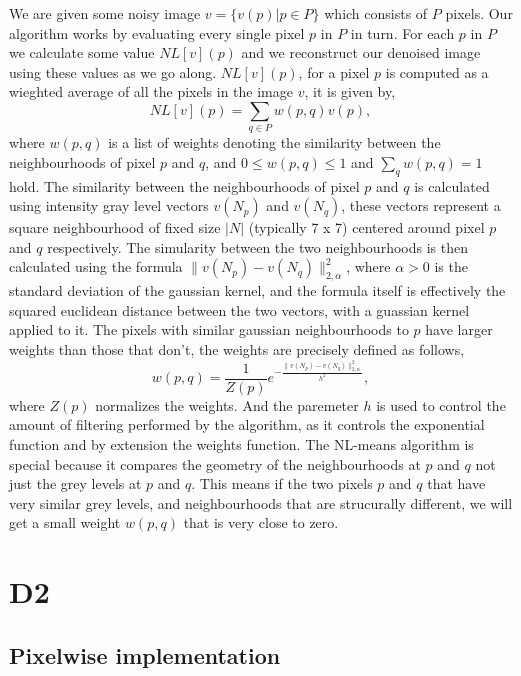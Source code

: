\documentclass[fullpage]{article}
\begin{document}
We are given some noisy image $v = \{v(p) | p \in P\}$ which consists of $P$ pixels. Our algorithm works by evaluating every single pixel $p$ in $P$ in turn. For each $p$ in $P$ we calculate some value $NL[v](p)$ and we reconstruct our denoised image using these values as we go along. $NL[v](p)$, for a pixel $p$ is computed as a wieghted average of all the pixels in the image $v$, it is given by,
$$NL[v](p) = \sum_{q \in P} w(p,q)v(p),$$
where $w(p,q)$ is a list of weights denoting the similarity between the neighbourhoods of pixel $p$ and $q$, and $0 \le w(p,q) \le 1$ and $\sum_{q}w(p,q) = 1$ hold. The similarity between the neighbourhoods of pixel $p$ and $q$ is calculated using intensity gray level vectors $v(N_{p})$ and $v(N_{q})$, these vectors represent a square neighbourhood of fixed size $|N|$ (typically 7 x 7) centered around pixel $p$ and $q$ respectively. The simularity between the two neighbourhoods is then calculated using the formula $\parallel v(N_{p}) - v(N_{q}) \parallel_{2, \alpha}^{2}$, where $\alpha > 0$ is the standard deviation of the gaussian kernel, and the formula itself is effectively the squared euclidean distance between the two vectors, with a guassian kernel applied to it. The pixels with similar gaussian neighbourhoods to $p$ have larger weights than those that don't, the weights are precisely defined as follows,
$$w(p,q) = \frac{1}{Z(p)} e^{-\frac{\parallel v(N_{p}) - v(N_{q}) \parallel_{2, \alpha}^{2}}{h^2}},$$
where $Z(p)$ normalizes the weights. And the paremeter $h$ is used to control the amount of filtering performed by the algorithm, as it controls the exponential function and by extension the weights function. The NL-means algorithm is special because it compares the geometry of the neighbourhoods at $p$ and $q$ not just the grey levels at $p$ and $q$. This means if the two pixels $p$ and $q$ that have very similar grey levels, and neighbourhoods that are strucurally different, we will get a small weight $w(p,q)$ that is very close to zero.
\section{D2}
\subsection{Pixelwise implementation}
\end{document}
